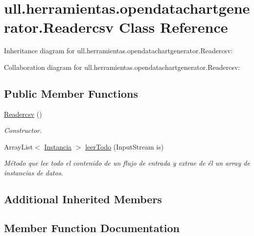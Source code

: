 \hypertarget{classull_1_1herramientas_1_1opendatachartgenerator_1_1_readercsv}{}\section{ull.\+herramientas.\+opendatachartgenerator.\+Readercsv Class Reference}
\label{classull_1_1herramientas_1_1opendatachartgenerator_1_1_readercsv}


Inheritance diagram for ull.\+herramientas.\+opendatachartgenerator.\+Readercsv\+:


Collaboration diagram for ull.\+herramientas.\+opendatachartgenerator.\+Readercsv\+:
\subsection*{Public Member Functions}
\begin{DoxyCompactItemize}
\item 
\mbox{\label{classull_1_1herramientas_1_1opendatachartgenerator_1_1_readercsv_a53401d4432bce30b5f61d464ae3fa0dc}} 
\mbox{\hyperlink{classull_1_1herramientas_1_1opendatachartgenerator_1_1_readercsv_a53401d4432bce30b5f61d464ae3fa0dc}{Readercsv}} ()
\begin{DoxyCompactList}\small\item\em Constructor. \end{DoxyCompactList}\item 
Array\+List$<$ \mbox{\hyperlink{classull_1_1herramientas_1_1opendatachartgenerator_1_1_instancia}{Instancia}} $>$ \mbox{\hyperlink{classull_1_1herramientas_1_1opendatachartgenerator_1_1_readercsv_a87043f91c60186d326d3928c660a731a}{leer\+Todo}} (Input\+Stream is)
\begin{DoxyCompactList}\small\item\em Método que lee todo el contenido de un flujo de entrada y extrae de él un array de instancias de datos. \end{DoxyCompactList}\end{DoxyCompactItemize}
\subsection*{Additional Inherited Members}


\subsection{Member Function Documentation}
\mbox{\label{classull_1_1herramientas_1_1opendatachartgenerator_1_1_readercsv_a87043f91c60186d326d3928c660a731a}} 
